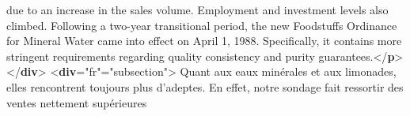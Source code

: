 \begin{shaded}
\hspace*{1em}\hspace*{1em} due to an increase in the sales volume.\mbox{}\newline 
{}Employment and investment levels also climbed.\mbox{}\newline 
{}Following a two-year transitional period,\mbox{}\newline 
\hspace*{1em}\hspace*{1em} the new Foodstuffs Ordinance for Mineral Water came into effect on\mbox{}\newline 
\hspace*{1em}\hspace*{1em} April 1, 1988. Specifically, it contains more stringent requirements\mbox{}\newline 
\hspace*{1em}\hspace*{1em} regarding quality consistency and purity guarantees.{</\textbf{p}>}\mbox{}\newline 
{</\textbf{div}>}\mbox{}\newline 
{<\textbf{div}\hspace*{1em}{xml:lang}="{fr}"\hspace*{1em}{type}="{subsection}">}\mbox{}\newline 
{}\mbox{}\newline 
\hspace*{1em}Quant aux eaux minérales\mbox{}\newline 
\hspace*{1em}\hspace*{1em} et aux limonades, elles rencontrent toujours plus d'adeptes. En effet,\mbox{}\newline 
\hspace*{1em}\hspace*{1em} notre sondage fait ressortir des ventes nettement supérieures\mbox{}\newline 

\end{shaded}
